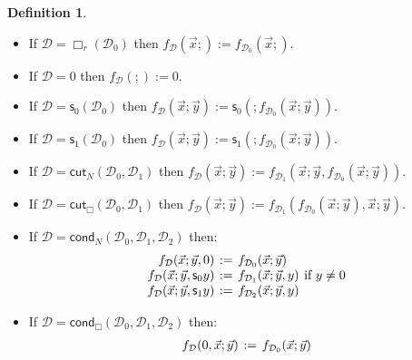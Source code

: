 \documentclass[manuscript,screen]{acmart}
\newcommand{\dfn}{:=}
\theoremstyle{definition}
\newtheorem{defn}[thm]{Definition}
\theoremstyle{remark}
\newcommand{\n}{N}
\newcommand{\sq}{\Box}
\renewcommand{\succ}[1]{\mathsf{s}_{#1}}
\newcommand{\cnd}{\mathsf{cond}}
\newcommand{\denot}[1]{f_{#1}}
\newcommand{\der}{\mathcal{D}}
\newcommand{\cut}{\mathsf{cut}}
\newcommand{\boxrig}{\sq_r}
\newcommand{\sqr}{\boxrig}
\begin{document}
\begin{defn}
\begin{itemize}
    \item If $\der=\sqr(\der_0)$ then $\denot {\der} (\vec x;) \dfn \denot{\der_0} (\vec x;)$.
    \item If $\der=0$ then $\denot {\der}(;) \dfn 0$.
    \item If $\der=\succ 0(\der_0)$ then $\denot {\der} (\vec x;\vec y) \dfn \succ 0 (; \denot{\der_0}(\vec x;\vec y))$.
    \item  If $\der=\succ 1(\der_0)$ then $\denot {\der} (\vec x;\vec y) \dfn \succ 1 (; \denot{\der_0}(\vec x;\vec y))$.
    \item If $\der = \cut_\n(\der_0, \der_1)$ then $\denot {\der} (\vec x;\vec y) \dfn \denot{\der_1}(\vec x; \vec y, \denot{\der_0} (\vec x; \vec y))$.
    \item If $\der = \cut_\sq(\der_0, \der_1)$ then $\denot {\der} (\vec x;\vec y) \dfn \denot{\der_1}(\denot{\der_0} (\vec x; \vec y), \vec x; \vec y)$.
    \item If $\der=\cnd_\n(\der_0, \der_1, \der_2)$ then:
    \[
        \arraycolsep=2pt
    \begin{array}{rcll}
         \denot {\der} (\vec x;\vec y,0) & \dfn &  \denot{\der_0} (\vec x;\vec y) \\
         \denot {\der} (\vec x; \vec y, \succ 0 y) & \dfn & \denot{\der_1} (\vec x; \vec y, y)  & \text{if $y\neq 0$} \\
         \denot {\der} (\vec x; \vec y, \succ 1 y) & \dfn & \denot{\der_2} (\vec x; \vec y, y) 
    \end{array}
    \]
    \item  If $\der=\cnd_\sq(\der_0, \der_1, \der_2)$  then:
    \[
            \arraycolsep=2pt
    \begin{array}{rcll}
         \denot \der (0, \vec x;\vec y) & \dfn &  \denot{\der_0} (\vec x;\vec y) \\

\end{array}\]
\end{itemize}
\end{defn}
\end{document}
